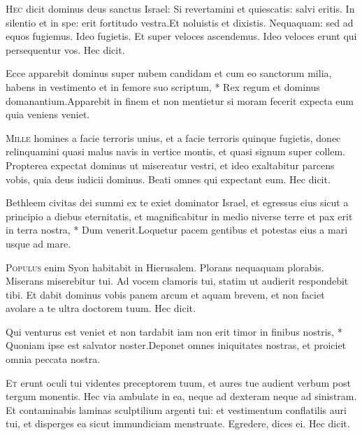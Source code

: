 \begin{multicols*}{2}
\lettrine[lines=2]{\zallmancaps \color{Blue} H}{ec} dicit dominus deus sanctus Israel: Si revertamini et quiescatis: salvi eritis. In silentio et in spe: erit fortitudo vestra.Et noluistis et dixistis. Nequaquam: sed ad equos fugiemus. Ideo fugietis. Et super veloces ascendemus. Ideo veloces erunt qui persequentur vos. Hec dicit.
\begin{responsory}
{Ecce apparebit dominus super nubem candidam et cum eo sanctorum milia, habens in vestimento et in femore suo scriptum, * Rex regum et dominus domanantium.}{Apparebit in finem et non mentietur si moram fecerit expecta eum quia veniens veniet.}
\end{responsory}
\lettrine[lines=2]{\zallmancaps \color{Red} M}{ille} homines a facie terroris unius, et a facie terroris quinque fugietis, donec relinquamini quasi malus navis in vertice montis, et quasi signum super collem. Propterea expectat dominus ut misereatur vestri, et ideo exaltabitur parcens vobis, quia deus iudicii dominus. Beati omnes qui expectant eum. Hec dicit.
\begin{responsory}
{Bethleem civitas dei summi ex te exiet dominator Israel, et egressus eius sicut a principio a diebus eternitatis, et magnificabitur in medio niverse terre et pax erit in terra nostra, * Dum venerit.}{Loquetur pacem gentibus et potestas eius a mari usque ad mare.}
\end{responsory}
\lettrine[lines=2]{\zallmancaps \color{Blue} P}{opulus} enim Syon habitabit in Hierusalem. Plorans nequaquam plorabis. Miserans miserebitur tui. Ad vocem clamoris tui, statim ut audierit respondebit tibi. Et dabit dominus vobis panem arcum et aquam brevem, et non faciet
avolare a te ultra doctorem tuum. Hec dicit.
\begin{responsory-doxology}
{Qui venturus est veniet et non tardabit iam non erit timor in finibus nostris, * Quoniam ipse est salvator noster.}{Deponet omnes iniquitates nostras, et proiciet omnia peccata nostra.}
\end{responsory-doxology}
\lettrine[lines=2]{\zallmancaps \color{Red} E}{t} erunt oculi tui videntes preceptorem tuum, et aures tue audient verbum post tergum monentis. Hec via ambulate in ea, neque ad dexteram neque ad sinistram. Et contaminabis laminas sculptilium argenti tui: et vestimentum conflatilis auri tui, et disperges ea sicut immundiciam menstruate. Egredere, dices ei. Hec dicit.

\end{multicols*}

